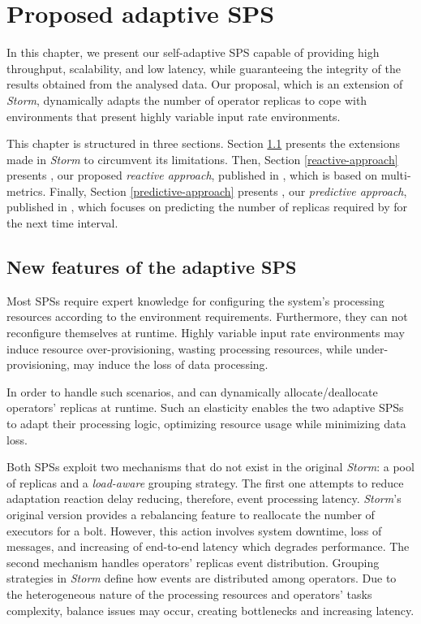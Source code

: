 %
\chapter{Proposed adaptive SPS}
\label{solution}
In this chapter, we present our self-adaptive SPS capable of providing high throughput, scalability, and low latency, while guaranteeing the integrity of the results obtained from the analysed data. Our proposal, which is an extension of \textit{Storm}, dynamically adapts the number of operator replicas to cope with environments that present highly variable input rate environments.

This chapter is structured in three sections. Section \ref{modified-sps} presents the extensions made in \textit{Storm} to circumvent its limitations. Then, Section \ref{reactive-approach} presents \rSPS{}, our proposed \textit{reactive approach}, published in \citep{WladdimiroNCA}, which is based on multi-metrics. Finally, Section \ref{predictive-approach} presents \pSPS{}, our \textit{predictive approach}, published in \citep{WladdimiroSBAC}, which focuses on predicting the number of replicas required by for the next time interval.


\section{New features of the adaptive SPS}
\label{modified-sps}
Most SPSs require expert knowledge for configuring the system's processing resources according to the environment requirements. Furthermore, they can not reconfigure themselves at runtime. Highly variable input rate environments may induce resource over-provisioning, wasting processing resources, while under-provisioning, may induce the loss of data processing.

In order to handle such scenarios, \rSPS{} and \pSPS{} can dynamically allocate/deallocate operators' replicas at runtime. Such an elasticity enables the two adaptive SPSs to adapt their processing logic, optimizing resource usage while minimizing data loss.

Both SPSs exploit two mechanisms that do not exist in the original \textit{Storm}: a pool of replicas and a \textit{load-aware} grouping strategy. The first one attempts to reduce adaptation reaction delay reducing, therefore, event processing latency. \textit{Storm}'s original version provides a rebalancing feature to reallocate the number of executors for a bolt. However, this action involves system downtime, loss of messages, and increasing of end-to-end latency which degrades performance. The second mechanism handles operators' replicas event distribution. Grouping strategies in \textit{Storm} define how events are distributed among operators. Due to the heterogeneous nature of the processing resources and operators' tasks complexity, balance issues may occur, creating bottlenecks and increasing latency.

